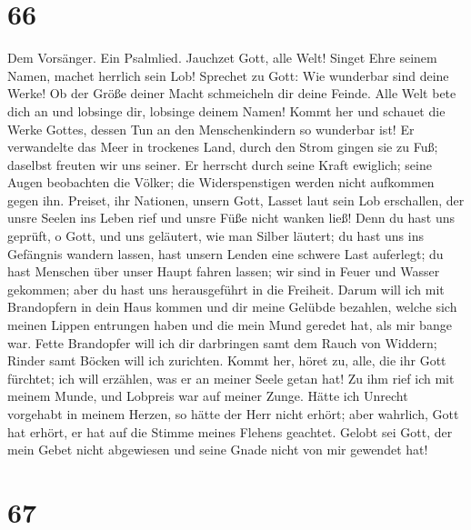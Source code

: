 \hypertarget{section-65}{%
\section{66}\label{section-65}}

 Dem Vorsänger. Ein Psalmlied. Jauchzet Gott, alle Welt!
 Singet Ehre seinem Namen, machet herrlich sein Lob!
 Sprechet zu Gott: Wie wunderbar sind deine Werke! Ob der
Größe deiner Macht schmeicheln dir deine Feinde.  Alle
Welt bete dich an und lobsinge dir, lobsinge deinem Namen!
 Kommt her und schauet die Werke Gottes, dessen Tun an den
Menschenkindern so wunderbar ist!  Er verwandelte das Meer
in trockenes Land, durch den Strom gingen sie zu Fuß; daselbst freuten
wir uns seiner.  Er herrscht durch seine Kraft ewiglich;
seine Augen beobachten die Völker; die Widerspenstigen werden nicht
aufkommen gegen ihn.  Preiset, ihr Nationen, unsern Gott,
Lasset laut sein Lob erschallen,  der unsre Seelen ins
Leben rief und unsre Füße nicht wanken ließ!  Denn du
hast uns geprüft, o Gott, und uns geläutert, wie man Silber läutert;
 du hast uns ins Gefängnis wandern lassen, hast unsern
Lenden eine schwere Last auferlegt;  du hast Menschen
über unser Haupt fahren lassen; wir sind in Feuer und Wasser gekommen;
aber du hast uns herausgeführt in die Freiheit.  Darum
will ich mit Brandopfern in dein Haus kommen und dir meine Gelübde
bezahlen,  welche sich meinen Lippen entrungen haben und
die mein Mund geredet hat, als mir bange war.  Fette
Brandopfer will ich dir darbringen samt dem Rauch von Widdern; Rinder
samt Böcken will ich zurichten.  Kommt her, höret zu,
alle, die ihr Gott fürchtet; ich will erzählen, was er an meiner Seele
getan hat!  Zu ihm rief ich mit meinem Munde, und
Lobpreis war auf meiner Zunge.  Hätte ich Unrecht
vorgehabt in meinem Herzen, so hätte der Herr nicht erhört;
 aber wahrlich, Gott hat erhört, er hat auf die Stimme
meines Flehens geachtet.  Gelobt sei Gott, der mein Gebet
nicht abgewiesen und seine Gnade nicht von mir gewendet hat!

\hypertarget{section-66}{%
\section{67}\label{section-66}}

